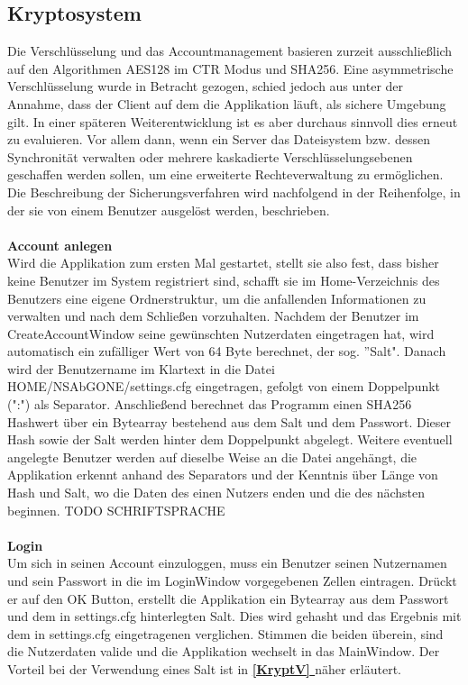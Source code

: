 \documentclass[12pt,a4paper,bibliography=totocnumbered,listof=totocnumbered]{scrartcl}
\newcommand*{\fullref}[1]{\textbf{\hyperref[{#1}]{\ref*{#1} \nameref*{#1}}}}
\begin{document}
\subsection{Kryptosystem}
Die Verschlüsselung und das Accountmanagement basieren zurzeit ausschließlich auf den Algorithmen AES128 im CTR Modus und SHA256. Eine asymmetrische Verschlüsselung wurde in Betracht gezogen, schied jedoch aus unter der Annahme, dass der Client auf dem die Applikation läuft, als sichere Umgebung gilt. In einer späteren Weiterentwicklung ist es aber durchaus sinnvoll dies erneut zu evaluieren. Vor allem dann, wenn ein Server das Dateisystem bzw. dessen Synchronität verwalten oder mehrere kaskadierte Verschlüsselungsebenen geschaffen werden sollen, um eine erweiterte Rechteverwaltung zu ermöglichen. Die Beschreibung der Sicherungsverfahren wird nachfolgend in der Reihenfolge, in der sie von einem Benutzer ausgelöst werden, beschrieben.
\\\\\textbf{Account anlegen}\\
Wird die Applikation zum ersten Mal gestartet, stellt sie also fest, dass bisher keine Benutzer im System registriert sind, schafft sie im Home-Verzeichnis des Benutzers eine eigene Ordnerstruktur, um die anfallenden Informationen zu verwalten und nach dem Schließen vorzuhalten. Nachdem der Benutzer im CreateAccountWindow seine gewünschten Nutzerdaten eingetragen hat, wird automatisch ein zufälliger Wert von 64 Byte berechnet, der sog. ''Salt". Danach wird der Benutzername im Klartext in die Datei HOME/NSAbGONE/settings.cfg eingetragen, gefolgt von einem Doppelpunkt (":") als Separator. Anschließend berechnet das Programm einen SHA256 Hashwert über ein Bytearray bestehend aus dem Salt und dem Passwort. Dieser Hash sowie der Salt werden hinter dem Doppelpunkt abgelegt. Weitere eventuell angelegte Benutzer werden auf dieselbe Weise an die Datei angehängt, die Applikation erkennt anhand des Separators und der Kenntnis über Länge von Hash und Salt, wo die Daten des einen Nutzers enden und die des nächsten beginnen. TODO SCHRIFTSPRACHE
\\\\\textbf{Login}\\
Um sich in seinen Account einzuloggen, muss ein Benutzer seinen Nutzernamen und sein Passwort in die im LoginWindow vorgegebenen Zellen eintragen. Drückt er auf den OK Button, erstellt die Applikation ein Bytearray aus dem Passwort und dem in settings.cfg hinterlegten Salt. Dies wird gehasht und das Ergebnis mit dem in settings.cfg eingetragenen verglichen. Stimmen die beiden überein, sind die Nutzerdaten valide und die Applikation wechselt in das MainWindow. Der Vorteil bei der Verwendung eines Salt ist in \fullref{KryptV} näher erläutert.
\end{document}
